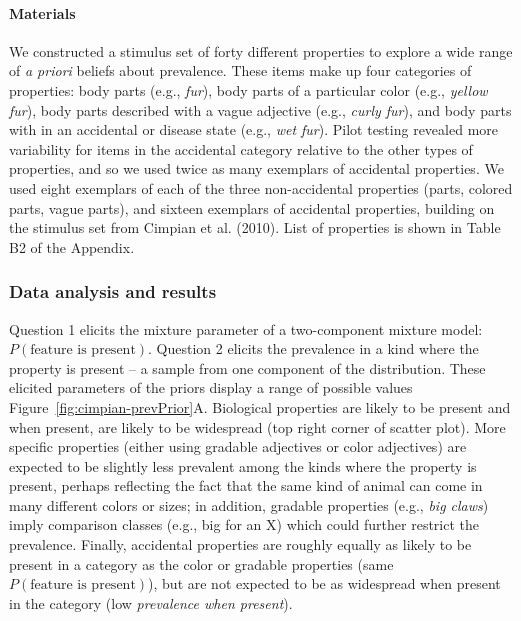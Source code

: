 \documentclass[floatsintext,doc]{apa6}
\let\oldparagraph\paragraph
\renewcommand{\paragraph}[1]{\oldparagraph{#1}\mbox{}}
\begin{document}
\paragraph{Materials}
We constructed a stimulus set of forty different properties to explore a
wide range of \emph{a priori} beliefs about prevalence. These items make
up four categories of properties: body parts (e.g., \emph{fur}), body
parts of a particular color (e.g., \emph{yellow fur}), body parts
described with a vague adjective (e.g., \emph{curly fur}), and body
parts with in an accidental or disease state (e.g., \emph{wet fur}).
Pilot testing revealed more variability for items in the
accidental category relative to the other types of properties, and so we used
twice as many exemplars of accidental properties. We used eight exemplars of each of the three
non-accidental properties (parts, colored parts, vague parts), and
sixteen exemplars of accidental properties, building on the stimulus set
from Cimpian et al. (2010). List of properties is shown in Table B2 of
the Appendix.


\subsubsection{Data analysis and
results}\label{data-analysis-and-results}

Question 1 elicits the mixture parameter of a two-component mixture
model: \(P(\text{feature is present})\). Question 2 elicits the
prevalence in a kind where the property is present -- a sample from one component of the distribution. These elicited
parameters of the priors display a range of possible values
Figure~\ref{fig:cimpian-prevPrior}A. Biological properties are likely to
be present and when present, are likely to be widespread (top right
corner of scatter plot). More specific properties (either using gradable
adjectives or color adjectives) are expected to be slightly less
prevalent among the kinds where the property is present, perhaps
reflecting the fact that the same kind of animal can come in many
different colors or sizes; in addition, gradable properties (e.g., \emph{big claws}) imply comparison classes (e.g., big for an X) which could further restrict the prevalence. Finally, accidental properties
are roughly equally as likely to be present in a category as the color or gradable
properties (same \(P(\text{feature is present})\)), but are not expected
to be as widespread when present in the category (low \emph{prevalence
when present}).
\end{document}
